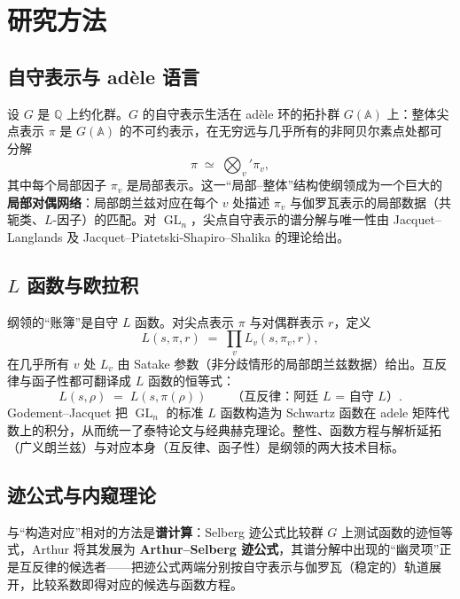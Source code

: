 \section{研究方法}\label{sec:methods}

\subsection{自守表示与 adèle 语言}

设 $G$ 是 $\mathbb{Q}$ 上约化群。$G$ 的自守表示生活在 adèle 环的拓扑群 $G(\mathbb{A})$ 上：整体尖点表示 $\pi$ 是 $G(\mathbb{A})$ 的不可约表示，在无穷远与几乎所有的非阿贝尔素点处都可分解
\begin{equation}
    \pi \;\simeq\; \bigotimes_v' \pi_v ,
\end{equation}
其中每个局部因子 $\pi_v$ 是局部表示。这一“局部--整体”结构使纲领成为一个巨大的\textbf{局部对偶网络}：局部朗兰兹对应在每个 $v$ 处描述 $\pi_v$ 与伽罗瓦表示的局部数据（共轭类、$L$-因子）的匹配。对 $\operatorname{GL}_n$，尖点自守表示的谱分解与唯一性由 Jacquet--Langlands 及 Jacquet--Piatetski-Shapiro--Shalika 的理论给出。

\subsection{$L$ 函数与欧拉积}

纲领的“账簿”是自守 $L$ 函数。对尖点表示 $\pi$ 与对偶群表示 $r$，定义
\begin{equation}
    L(s, \pi, r) \;=\; \prod_v L_v(s, \pi_v, r),
\end{equation}
在几乎所有 $v$ 处 $L_v$ 由 Satake 参数（非分歧情形的局部朗兰兹数据）给出。互反律与函子性都可翻译成 $L$ 函数的恒等式：
\begin{equation}
    L(s, \rho) \;=\; L(s, \pi(\rho)) \qquad \text{（互反律：阿廷 $L$ = 自守 $L$）}.
\end{equation}
Godement--Jacquet 把 $\operatorname{GL}_n$ 的标准 $L$ 函数构造为 Schwartz 函数在 adele 矩阵代数上的积分，从而统一了泰特论文与经典赫克理论。整性、函数方程与解析延拓（广义朗兰兹）与对应本身（互反律、函子性）是纲领的两大技术目标。

\subsection{迹公式与内窥理论}

与“构造对应”相对的方法是\textbf{谱计算}：Selberg 迹公式比较群 $G$ 上测试函数的迹恒等式，Arthur 将其发展为 \textbf{Arthur--Selberg 迹公式}，其谱分解中出现的“幽灵项”正是互反律的候选者——把迹公式两端分别按自守表示与伽罗瓦（稳定的）轨道展开，比较系数即得对应的候选与函数方程。

